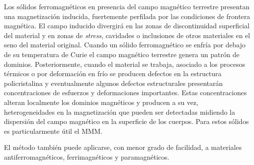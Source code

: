 Los sólidos ferromagnéticos en presencia del campo magnético terrestre presentan una magnetización inducida, fuertemente perfilada por las condiciones de frontera magnética. El campo inducido divergirá en las zonas de discontinuidad superficial del material y en zonas de \textit{stress}, cavidades o inclusiones de otros materiales en el seno del material original. 
Cuando un sólido ferromagnético se enfría por debajo de su temperatura de Curie el campo magnético terrestre genera un patrón de dominios. Posteriormente, cuando el material se trabaja, asociado a los procesos térmicos o por deformación en frío se producen defectos en la estructura policristalina y eventualmente algunos defectos estructurales presentarán concentraciones de esfuerzos y deformaciones importantes. Estas concentraciones alteran localmente los dominios magnéticos y producen a su vez, heterogeneidades en la magnetización que pueden ser detectadas midiendo la dispersión del campo magnético en la superficie de los cuerpos. 
Para estos sólidos es particularmente útil el MMM. 

El método también puede aplicarse, con menor grado de facilidad, a materiales  antiferromagnéticos, ferrimagnéticos y paramagnéticos.




